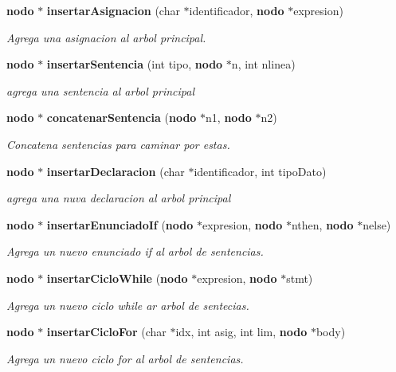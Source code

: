 \begin{CompactItemize}
{\bf nodo} $\ast$ {\bf insertar\-Asignacion} (char $\ast$identificador, {\bf nodo} $\ast$expresion)
\begin{CompactList}\small\item\em Agrega una asignacion al arbol principal. \item\end{CompactList}\item 
{\bf nodo} $\ast$ {\bf insertar\-Sentencia} (int tipo, {\bf nodo} $\ast$n, int nlinea)
\begin{CompactList}\small\item\em agrega una sentencia al arbol principal \item\end{CompactList}\item 
{\bf nodo} $\ast$ {\bf concatenar\-Sentencia} ({\bf nodo} $\ast$n1, {\bf nodo} $\ast$n2)
\begin{CompactList}\small\item\em Concatena sentencias para caminar por estas. \item\end{CompactList}\item 
{\bf nodo} $\ast$ {\bf insertar\-Declaracion} (char $\ast$identificador, int tipo\-Dato)
\begin{CompactList}\small\item\em agrega una nuva declaracion al arbol principal \item\end{CompactList}\item 
{\bf nodo} $\ast$ {\bf insertar\-Enunciado\-If} ({\bf nodo} $\ast$expresion, {\bf nodo} $\ast$nthen, {\bf nodo} $\ast$nelse)
\begin{CompactList}\small\item\em Agrega un nuevo enunciado if al arbol de sentencias. \item\end{CompactList}\item 
{\bf nodo} $\ast$ {\bf insertar\-Ciclo\-While} ({\bf nodo} $\ast$expresion, {\bf nodo} $\ast$stmt)
\begin{CompactList}\small\item\em Agrega un nuevo ciclo while ar arbol de sentecias. \item\end{CompactList}\item 
{\bf nodo} $\ast$ {\bf insertar\-Ciclo\-For} (char $\ast$idx, int asig, int lim, {\bf nodo} $\ast$body)
\begin{CompactList}\small\item\em Agrega un nuevo ciclo for al arbol de sentencias. \item\end{CompactList}\item 

\end{CompactItemize}
